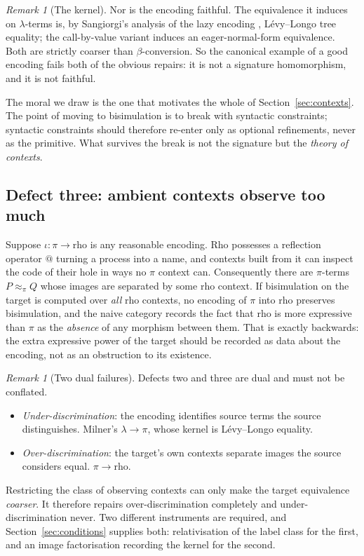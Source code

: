 \documentclass[11pt,a4paper]{article}
\theoremstyle{definition}
\theoremstyle{plain}
\theoremstyle{remark}
\newtheorem{remark}[definition]{Remark}
\newcommand{\bisim}{\approx}
\begin{document}
\begin{remark}[The kernel]
\label{rem:kernel}
Nor is the encoding faithful. The equivalence it induces on $\lambda$-terms is,
by Sangiorgi's analysis of the lazy encoding \cite{sangiorgi-lazy}, L\'evy--Longo
tree equality; the call-by-value variant induces an eager-normal-form equivalence.
Both are strictly coarser than $\beta$-conversion. So the canonical example of a
good encoding fails both of the obvious repairs: it is not a signature homomorphism,
and it is not faithful.
\end{remark}

The moral we draw is the one that motivates the whole of Section~\ref{sec:contexts}.
The point of moving to bisimulation is to break with syntactic constraints; syntactic
constraints should therefore re-enter only as optional refinements, never as the
primitive. What survives the break is not the signature but the \emph{theory of
contexts}.

\subsection{Defect three: ambient contexts observe too much}

Suppose $\iota : \pi \to \text{rho}$ is any reasonable encoding. Rho possesses a
reflection operator $@$ turning a process into a name, and contexts built from it
can inspect the code of their hole in ways no $\pi$ context can. Consequently there
are $\pi$-terms $P \bisim_\pi Q$ whose images are separated by some rho context. If
bisimulation on the target is computed over \emph{all} rho contexts, no encoding of
$\pi$ into rho preserves bisimulation, and the naive category records the fact that
rho is more expressive than $\pi$ as the \emph{absence} of any morphism between them.
That is exactly backwards: the extra expressive power of the target should be
recorded as data about the encoding, not as an obstruction to its existence.

\begin{remark}[Two dual failures]
\label{rem:dual}
Defects two and three are dual and must not be conflated.
\begin{itemize}[leftmargin=1.4em]
\item \emph{Under-discrimination}: the encoding identifies source terms the source
distinguishes. Milner's $\lambda \to \pi$, whose kernel is L\'evy--Longo equality.
\item \emph{Over-discrimination}: the target's own contexts separate images the
source considers equal. $\pi \to \text{rho}$.
\end{itemize}
Restricting the class of observing contexts can only make the target equivalence
\emph{coarser}. It therefore repairs over-discrimination completely and
under-discrimination never. Two different instruments are required, and
Section~\ref{sec:conditions} supplies both: relativisation of the label class for the
first, and an image factorisation recording the kernel for the second.
\end{remark}
\end{document}
